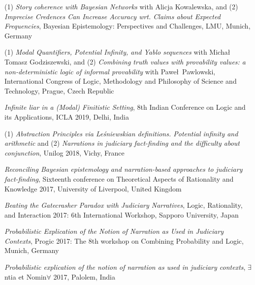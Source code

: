 \documentclass[10pt, a4paper]{article}
\newcommand{\years}[1]{\marginnote{\normalsize #1}}
\begin{document}
\years{2020}  (1) \emph{Story coherence with Bayesian Networks} with Alicja Kowalewska, and (2) \emph{ Imprecise Credences Can Increase Accuracy wrt. Claims about Expected Frequencies}, Bayesian Epistemology: Perspectives and Challenges, LMU, Munich, Germany





\years{2019} (1) \emph{Modal Quantifiers, Potential Infinity, and Yablo sequences} with Micha\l\, Tomasz Godziszewski, and (2) \emph{Combining truth values with provability values: a non-deterministic logic of informal provability} with Pawe\l\, Pawlowski, International Congress of Logic, Methodology and Philosophy of Science and Technology, Prague, Czech Republic


\years{2018}

\emph{Infinite liar in a (Modal) Finitistic Setting}, 8th Indian Conference on Logic and its Applications, ICLA 2019, Delhi, India

\vspace{0.5mm}

(1) \emph{Abstraction Principles via Le{\'s}niewskian definitions. Potential infinity and arithmetic} and (2) \emph{Narrations in judiciary fact-finding and the difficulty about conjunction}, Unilog 2018, Vichy, France

\years{2017} \emph{Reconciling Bayesian epistemology and narration-based approaches to judiciary fact-finding},   Sixteenth conference on
Theoretical Aspects of Rationality and Knowledge 2017, University of Liverpool, United Kingdom


\vspace{0.5mm}


\emph{Beating the Gatecrasher Paradox with Judiciary Narratives},
Logic, Rationality, and Interaction 2017: 6th International Workshop, Sapporo University, Japan



\vspace{0.5mm}


 \emph{Probabilistic Explication of the Notion of Narration as Used in Judiciary Contexts}, Progic 2017: The 8th workshop on Combining Probability and Logic,  Munich, Germany



\vspace{0.5mm}

\emph{Probabilistic explication of the notion of narration as used in judiciary contexts}, $\exists$ntia et Nomin$\forall$ 2017,  Palolem, India
\end{document}
